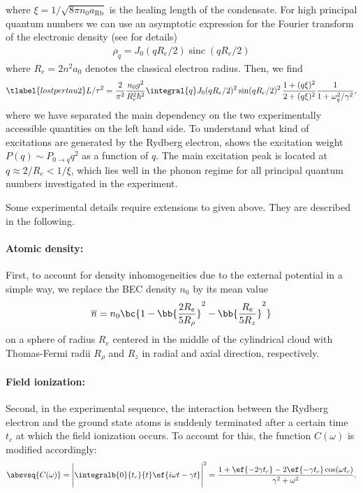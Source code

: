 where $\xi=1/\sqrt{8\pi n_0 a_{\text{Rb}}}$ is the healing length of the condensate. For high principal quantum numbers we can use an asymptotic expression for the Fourier transform of the electronic density  (see  for details)
\begin{align}
    \rho_q=J_0(q R_e/2) \operatorname{sinc}(q R_e/2)
\end{align}
where $R_e=2n^2 a_0$ denotes the classical electron radius. Then, we find
\begin{align} \tlabel{lostpertau2}
L/\tau^2 = \frac{2}{\pi^2}\frac{n_0 g^2}{R_e^2 \hbar^2}\integral{q} J_0(q R_e/2)^2 \sin(q R_e/2)^2 \,\frac{1+(q\xi)^2}{2+(q\xi)^2} \frac{1}{1+\omega_q^2/\gamma^2},
\end{align}
where we have separated the main dependency on the two experimentally accessible quantities on the left hand side.
To understand what kind of excitations are generated by the Rydberg electron,  shows the excitation weight $P(q)\sim P_{0\rightarrow q} q^2$ as a function of $q$. The main excitation peak is located at $q\approx 2/R_e < 1/\xi$, which lies well in the phonon regime for all principal quantum numbers investigated in the experiment.


Some experimental details require extensions to  given above. They are described in the following.

\paragraph{Atomic density:}
First, to account for density inhomogeneities due to the external potential in a simple way, we replace the BEC density $n_0$ by its mean value
\begin{align}
    \overline{n} = n_0 \bc{1-\bb{ \frac{2R_e}{5R_\rho} }^2 - \bb{ \frac{R_e}{5R_z} }^2}
\end{align}
on a sphere of radius $R_e$ centered in the middle of the cylindrical cloud with Thomas-Fermi radii $R_\rho$ and $R_z$ in radial and axial direction, respectively.

\paragraph{Field ionization:}
Second, in the experimental sequence, the interaction between the Rydberg electron and the ground state atoms is suddenly terminated after a certain time $t_c$ at which the field ionization occurs. To account for this, the function $C(\omega)$ is modified accordingly:
\begin{align}
\absvsq{C(\omega)}=\Bigg| \integralb{0}{t_c}{t}\ef{i\omega t-\gamma t} \Bigg|^2=\frac{1+\ef{-2\gamma t_c} -2 \ef{-\gamma t_c} \cos(\omega t_c)}{\gamma^2+\omega^2}.
\end{align}

